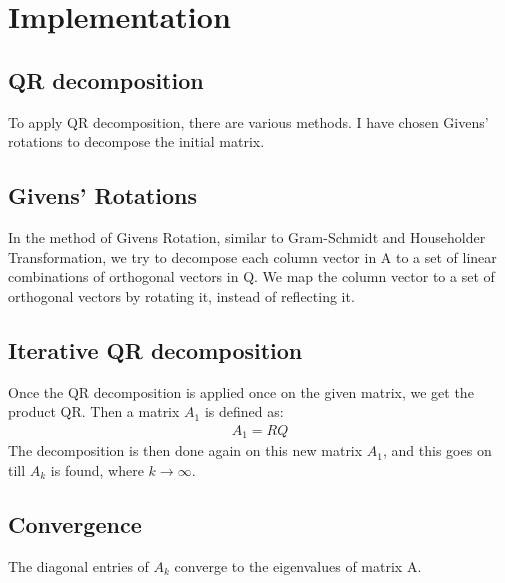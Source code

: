 \documentclass[journal]{IEEEtran}
\begin{document}
\begin{table}[h!]
\centering
{}
\end{table}


\section{Implementation}
\subsection{QR decomposition}
To apply QR decomposition, there are various methods. I have chosen Givens' rotations to decompose the initial matrix.
\subsection{Givens' Rotations}
In the method of Givens Rotation, similar to Gram-Schmidt and Householder Transformation, we try to decompose each column vector in A to a set of linear combinations of orthogonal vectors in Q.
We map the column vector to a set of orthogonal vectors by rotating it, instead of reflecting it.
\subsection{Iterative QR decomposition} 
Once the QR decomposition is applied once on the given matrix, we get the product QR. Then a matrix $A_1$ is defined as:
\begin{align*}
    A_1=RQ
\end{align*}
The decomposition is then done again on this new matrix $A_1$, and this goes on till $A_k$ is found, where $k \to \infty$. 
\subsection{Convergence}
The diagonal entries of $A_k$ converge to the eigenvalues of matrix A.
\end{document}
